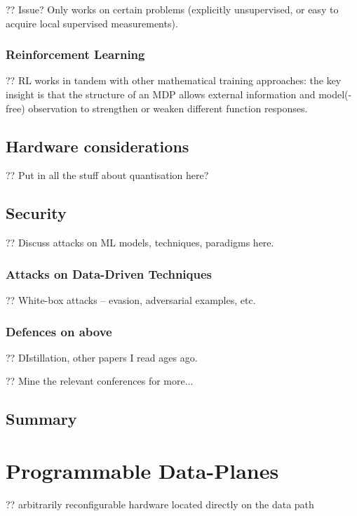 ?? Issue? Only works on certain problems (explicitly unsupervised, or easy to acquire local supervised measurements).

\subsection{Reinforcement Learning}

?? RL works in tandem with other mathematical training approaches: the key insight is that the structure of an MDP allows external information and model(-free) observation to strengthen or weaken different function responses.

\section{Hardware considerations}

?? Put in all the stuff about quantisation here?

\section{Security}

?? Discuss attacks on ML models, techniques, paradigms here.

\subsection{Attacks on Data-Driven Techniques}

?? White-box attacks -- evasion, adversarial examples, etc.

\subsection{Defences on above}

?? DIstillation, other papers I read ages ago.

?? Mine the relevant conferences for more...

\section{Summary}


\chapter{Programmable Data-Planes}

?? arbitrarily reconfigurable hardware located directly on the data path

